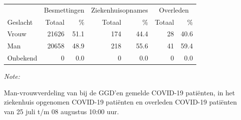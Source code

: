 \documentclass[
  english,
  man,floatsintext]{apa6}
\begin{document}
\begin{table}
\centering\begingroup\fontsize{11}{13}\selectfont

\begin{threeparttable}
\begin{tabular}{lrrrrrr}
\toprule
\multicolumn{1}{c}{ } & \multicolumn{2}{c}{Besmettingen} & \multicolumn{2}{c}{Ziekenhuisopnames} & \multicolumn{2}{c}{Overleden} \\
\cmidrule(l{3pt}r{3pt}){2-3} \cmidrule(l{3pt}r{3pt}){4-5} \cmidrule(l{3pt}r{3pt}){6-7}
Geslacht & Totaal & \% & Totaal & \% & Totaal & \%\\
\midrule
Vrouw & 21626 & 51.1 & 174 & 44.4 & 28 & 40.6\\
Man & 20658 & 48.9 & 218 & 55.6 & 41 & 59.4\\
Onbekend & 0 & 0.0 & 0 & 0.0 & 0 & 0.0\\
\bottomrule
\end{tabular}
\begin{tablenotes}
\item \textit{Note: } 
\item Man-vrouwverdeling van bij de GGD’en gemelde COVID-19 patiënten, in het ziekenhuis opgenomen COVID-19 patiënten en overleden COVID-19 patiënten van 25 juli t/m 08 augustus 10:00 uur.
\end{tablenotes}
\end{threeparttable}
\endgroup{}
\end{table}
\newpage
\end{document}
